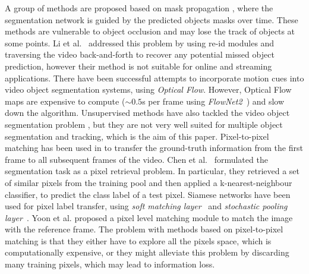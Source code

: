 \documentclass[10pt,twocolumn,letterpaper]{article}
\begin{document}
A group of methods are proposed based on mask propagation \cite{masktrack, Oh_2018_CVPR}, where the segmentation network is guided by the predicted objects masks over time. These methods are vulnerable to object occlusion and may lose the track of objects at some points. 
Li et al.~\cite{Li_2018_ECCV} addressed this problem by using re-id modules and traversing the video back-and-forth to recover any potential missed object prediction, however their method is not suitable for online and streaming applications.
There have been successful attempts to incorporate motion cues into video object segmentation systems, using {\it Optical Flow}\cite{hu2017maskrnn, Hu_2018_CVPR, Xiao_2018_CVPR, Bao_2018_CVPR, Cheng_2017_ICCV, Jain_2017_CVPR, Tsai_2016_CVPR, Yeo_2017_CVPR, Jang_2017_CVPR}. However, Optical Flow maps are expensive to compute ($\sim 0.5$s per frame using {\it FlowNet2}~\cite{flownet2}) and slow down the algorithm.
Unsupervised methods have also tackled the video object segmentation problem \cite{Li_2018_ECCV_un, Hu_2018_ECCV_un, Li_2018_CVPR, Tokmakov_2017_ICCV, Koh_2017_CVPR, Jain_2017_CVPR}, but they are not very well suited for multiple object segmentation and tracking, which is the aim of this paper.%
Pixel-to-pixel matching has been used in \cite{Chen_2018_CVPR, Hu_2018_ECCV, DAVIS2018-Interactive-2nd, Yoon_2017_ICCV} to transfer the ground-truth information from the first frame to all subsequent frames of the video.
Chen et al.~\cite{Chen_2018_CVPR} formulated the segmentation task as a pixel retrieval problem. In particular, they retrieved a set of similar pixels from the training pool and then applied a k-nearest-neighbour classifier, to predict the class label of a test pixel.
Siamese networks have been used for pixel label transfer, using {\it soft matching layer}~\cite{Hu_2018_ECCV} and {\it stochastic pooling layer}~\cite{DAVIS2018-Interactive-2nd}.
Yoon et al. \cite{Yoon_2017_ICCV} proposed a pixel level matching module to match the image with the reference frame. 
The problem with methods based on pixel-to-pixel matching is that they either have to explore all the pixels space, which is computationally expensive, or they might alleviate this problem by discarding many training pixels, which may lead to information loss.
\end{document}
